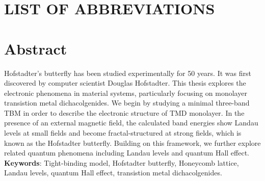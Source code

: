 \documentclass{report}
\begin{document}
\chapter*{\MakeUppercase{List of Abbreviations}}
\begin{acronym} %
	\end{acronym}
\newpage
\chapter*{Abstract}

Hofstadter's butterfly has been studied experimentally for 50 years. It was first discovered by computer scientist Douglas Hofstadter. This thesis explores the electronic phenomena in material systems, particularly focusing on monolayer transistion metal dichacolgenides. We begin by studying a minimal three-band \ac{TBM} in order to describe the electronic structure of TMD monolayer. In the presence of an external magnetic field, the calculated band energies show Landau levels at small fields and become fractal-structured at strong fields, which is known as the Hofstadter butterfly. Building on this framework, we further explore related quantum phenomena including Landau levels and quantum Hall effect.\\
\textbf{Keywords}: Tight-binding model, Hofstadter butterfly, Honeycomb lattice, Landau levels, quantum Hall effect, transistion metal dichacolgenides.



\newpage
{}




%
\end{document}
